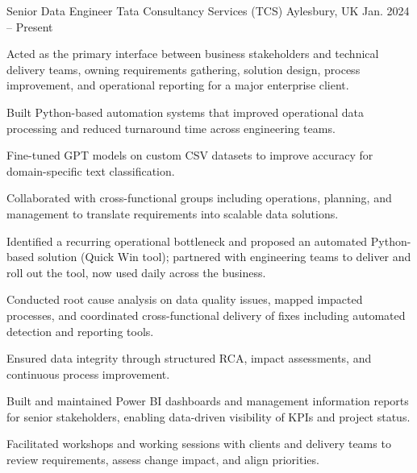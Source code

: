 
\begin{cventries}

  \cventry
    {Senior Data Engineer} %
    {Tata Consultancy Services (TCS)} %
    {Aylesbury, UK} %
    {Jan. 2024 -- Present} %
    {
      \begin{cvitems}
        \item {Acted as the primary interface between business stakeholders and technical delivery teams, owning requirements gathering, solution design, process improvement, and operational reporting for a major enterprise client.}
        \item {Built Python-based automation systems that improved operational data processing and reduced turnaround time across engineering teams.}
        \item {Fine-tuned GPT models on custom CSV datasets to improve accuracy for domain-specific text classification.}
        \item {Collaborated with cross-functional groups including operations, planning, and management to translate requirements into scalable data solutions.}
        \item {Identified a recurring operational bottleneck and proposed an automated Python-based solution (Quick Win tool); partnered with engineering teams to deliver and roll out the tool, now used daily across the business.}
        \item {Conducted root cause analysis on data quality issues, mapped impacted processes, and coordinated cross-functional delivery of fixes including automated detection and reporting tools.}
        \item {Ensured data integrity through structured RCA, impact assessments, and continuous process improvement.}
        \item {Built and maintained Power BI dashboards and management information reports for senior stakeholders, enabling data-driven visibility of KPIs and project status.}
        \item {Facilitated workshops and working sessions with clients and delivery teams to review requirements, assess change impact, and align priorities.}
      \end{cvitems}
    }


\end{cventries}
